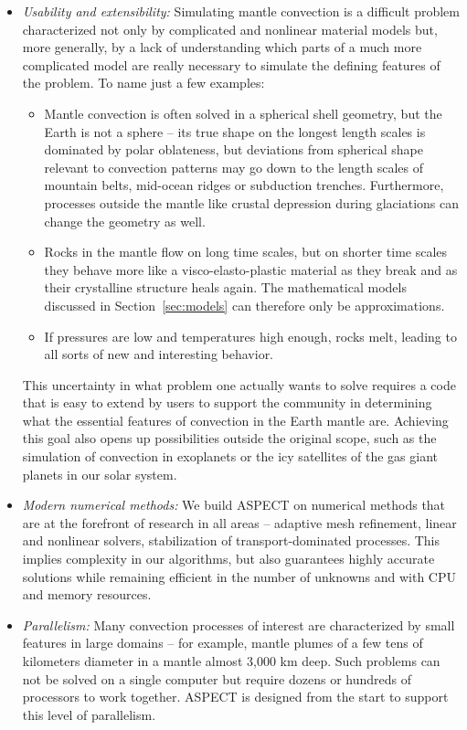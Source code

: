 \documentclass{article}
\newcommand{\aspect}{\textsc{ASPECT}}
\begin{document}
\begin{itemize}
\item \textit{Usability and extensibility:} Simulating mantle convection is a
  difficult problem characterized not only by complicated and nonlinear
  material models but, more generally, by a lack of understanding which parts
  of a much more complicated model are really necessary to simulate the
  defining features of the problem. To name just a few examples:
  \begin{itemize}
  \item Mantle convection is often solved in a spherical shell geometry, but
    the Earth is not a sphere -- its true shape on the longest length scales is
    dominated by polar oblateness, but deviations from spherical shape
    relevant to convection patterns may go down to the length scales of
    mountain belts, mid-ocean ridges or subduction trenches. Furthermore,
    processes outside the mantle like crustal depression during glaciations
    can change the geometry as well.
  \item Rocks in the mantle flow on long time scales, but on shorter time
    scales they behave more like a visco-elasto-plastic material as they break
    and as their crystalline structure heals again. The mathematical models
    discussed in Section~\ref{sec:models} can therefore only be
    approximations.
    \item If pressures are low and temperatures high enough, rocks melt,
      leading to all sorts of new and interesting behavior.
  \end{itemize}
  This uncertainty in what problem one actually wants to solve requires a code
  that is easy to extend by users to support the community in determining what
  the essential features of convection in the Earth mantle are. Achieving this
  goal also opens up possibilities outside the original scope, such as the
  simulation of convection in exoplanets or the icy satellites of the gas
  giant planets in our solar system.

\item \textit{Modern numerical methods:} We build \aspect{} on numerical
  methods that are at the forefront of research in all areas -- adaptive mesh
  refinement, linear and nonlinear solvers, stabilization of
  transport-dominated processes. This implies complexity in our algorithms,
  but also guarantees highly accurate solutions while remaining efficient in
  the number of unknowns and with CPU and memory resources.

\item \textit{Parallelism:} Many convection processes of interest are
  characterized by small features in large domains -- for example, mantle
  plumes of a few tens of kilometers diameter in a mantle almost 3,000 km
  deep. Such problems can not be solved on a single computer but require
  dozens or hundreds of processors to work together. \aspect{} is designed
  from the start to support this level of parallelism.


\end{itemize}
\end{document}

